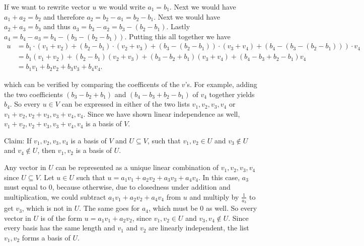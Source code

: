 \begin{xrcs}
\begin{prf}
    If we want to rewrite vector $u$ we would write $a_1 = b_1.$ Next we would have $a_1 + a_2 = b_2$ and therefore $a_2 = b_2 - a_1 = b_2-b_1$. Next we would have $a_2+a_3=b_3$ and thus $a_3= b_3-a_2 = b_3 - (b_2-b_1)$. Lastly $a_4 = b_4-a_3 = b_4-(b_3 - (b_2-b_1))$. Putting this all together we have
    \[
      \begin{aligned}
        u
        & = b_1 \cdot (v_1+v_2) + (b_2-b_1)\cdot(v_2+v_3) + (b_3 - (b_2-b_1)) \cdot (v_3 + v_4) + (b_4-(b_3 - (b_2-b_1))) \cdot v_4 \\
        & = b_1  (v_1+v_2) + (b_2-b_1)(v_2+v_3) + (b_3 - b_2+b_1)  (v_3 + v_4) + (b_4-b_3+b_2-b_1)  v_4 \\
        & = b_1 v_1 + b_2 v_2 + b_3 v_3 + b_4 v_4.
      \end{aligned}
    \]

    which can be verified by comparing the coefficents of the $v$'s. For example, adding the two coefficients $(b_3 - b_2+b_1)$ and $(b_4-b_3+b_2-b_1)$ of $v_4$ together yields $b_4$. So every $u \in V$ can be expressed in either of the two lists $v_1, v_2, v_3, v_4$ or $v_1 + v_2, v_2 + v_3, v_3+v_4, v_4$. Since we have shown linear independence as well, $v_1 + v_2, v_2 + v_3, v_3+v_4, v_4$ is a basis of $V$.
  \end{prf}
\end{xrcs}

\begin{xrcs}
  Claim: If $v_1, v_2, v_3, v_4$ is a basis of $V$ and $U \subseteq V$, such that $v_1, v_2 \in U$ and $v_3 \notin U$ and $v_4 \notin U$, then $v_1, v_2$ is a basis of $U$.
\end{xrcs}
\begin{prf}
  Any vector in $U$ can be represented as a unique linear combination of $v_1, v_2, v_3, v_4$ since $U \subseteq V$. Let $u\in U$ such that $u=a_1 v_1 + a_2 v_2 + a_3 v_3 + a_4 v_4$. In this case, $a_3$ must equal to $0$, because otherwise, due to closedness under addition and multiplication, we could subtract $a_1 v_1 + a_2 v_2+a_4v_4$ from $u$ and multiply by $\frac{1}{a_3}$ to get $v_3$, which is not in $U$. The same goes for $a_4$, which must be $0$ as well. So every vector in $U$ is of the form $u=a_1 v_1 + a_2 v_2$, since $v_1, v_2 \in U$ and $v_3, v_4 \notin U$. Since every basis has the same length and $v_1$ and $v_2$ are linearly independent, the list $v_1, v_2$ forms a basis of $U$.
\end{prf}

